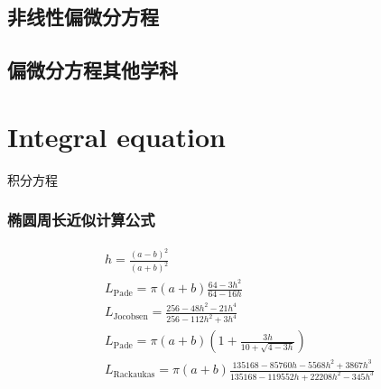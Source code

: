 \documentclass[UTF8]{../09-Mathematics}
\begin{document}
\section{非线性偏微分方程}
\section{偏微分方程其他学科}


\chapter{Integral equation}

积分方程


\subsection{椭圆周长近似计算公式}

\begin{equation}
    \begin{split}
        & h = \frac{(a-b)^2}{(a+b)^2}\\
        &L_{\text{Pade}} = \pi (a+b)\frac{64-3h^2}{64-16h}\\
        &L_{\text{Jocobsen}} = \frac{256-48h^2-21h^4}{256-112h^2+3h^4}\\
        & L_{\text{Pade}} = \pi (a+b)(1+\frac{3h}{10+\sqrt{4-3h}})\\
        &L_{\text{Rackaukas}} = \pi (a+b)\frac{135168-85760h-5568h^2+3867h^3}{135168-119552h+22208h^2-345h^3}
    \end{split}
\end{equation}
 
\end{document}
